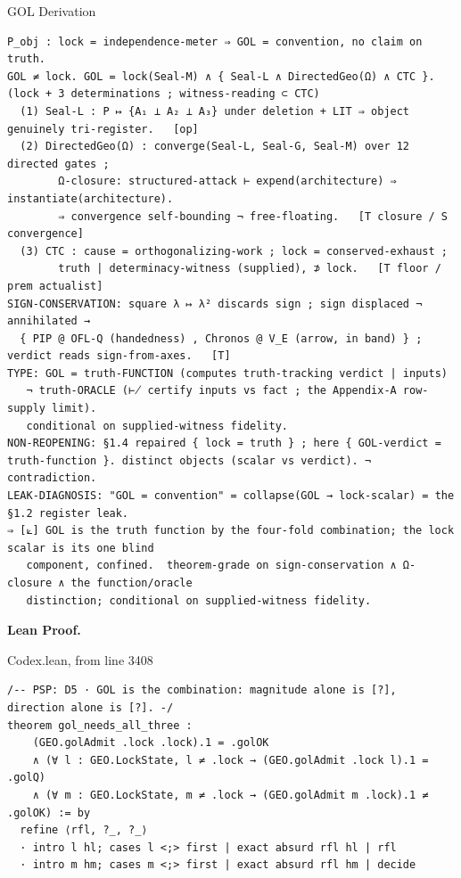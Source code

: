 \documentclass[10pt,twocolumn]{article}
\begin{document}
\begin{golbox}{GOL Derivation}
\begin{lstlisting}[style=golv]
P_obj : lock = independence-meter ⇒ GOL = convention, no claim on truth.
GOL ≠ lock. GOL = lock(Seal-M) ∧ { Seal-L ∧ DirectedGeo(Ω) ∧ CTC }. (lock + 3 determinations ; witness-reading ⊂ CTC)
  (1) Seal-L : P ↦ {A₁ ⊥ A₂ ⊥ A₃} under deletion + LIT ⇒ object genuinely tri-register.   [op]
  (2) DirectedGeo(Ω) : converge(Seal-L, Seal-G, Seal-M) over 12 directed gates ;
        Ω-closure: structured-attack ⊢ expend(architecture) ⇒ instantiate(architecture).
        ⇒ convergence self-bounding ¬ free-floating.   [T closure / S convergence]
  (3) CTC : cause = orthogonalizing-work ; lock = conserved-exhaust ;
        truth | determinacy-witness (supplied), ⊅ lock.   [T floor / prem actualist]
SIGN-CONSERVATION: square λ ↦ λ² discards sign ; sign displaced ¬ annihilated →
  { PIP @ OFL-Q (handedness) , Chronos @ V_E (arrow, in band) } ; verdict reads sign-from-axes.   [T]
TYPE: GOL = truth-FUNCTION (computes truth-tracking verdict | inputs)
   ¬ truth-ORACLE (⊬ certify inputs vs fact ; the Appendix-A row-supply limit).
   conditional on supplied-witness fidelity.
NON-REOPENING: §1.4 repaired { lock = truth } ; here { GOL-verdict = truth-function }. distinct objects (scalar vs verdict). ¬ contradiction.
LEAK-DIAGNOSIS: "GOL = convention" = collapse(GOL → lock-scalar) = the §1.2 register leak.
⇒ [⟀] GOL is the truth function by the four-fold combination; the lock scalar is its one blind
   component, confined.  theorem-grade on sign-conservation ∧ Ω-closure ∧ the function/oracle
   distinction; conditional on supplied-witness fidelity.
\end{lstlisting}
\end{golbox}

\textbf{Lean Proof.}

\begin{leanexcerpt}{Codex.lean, from line 3408}
\begin{lstlisting}[style=leanx,firstnumber=3408]
/-- PSP: D5 · GOL is the combination: magnitude alone is [?], direction alone is [?]. -/
theorem gol_needs_all_three :
    (GEO.golAdmit .lock .lock).1 = .golOK
    ∧ (∀ l : GEO.LockState, l ≠ .lock → (GEO.golAdmit .lock l).1 = .golQ)
    ∧ (∀ m : GEO.LockState, m ≠ .lock → (GEO.golAdmit m .lock).1 ≠ .golOK) := by
  refine ⟨rfl, ?_, ?_⟩
  · intro l hl; cases l <;> first | exact absurd rfl hl | rfl
  · intro m hm; cases m <;> first | exact absurd rfl hm | decide
\end{lstlisting}
\end{leanexcerpt}
\end{document}

